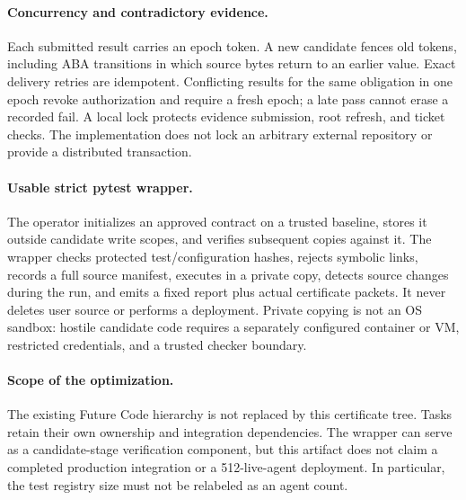 \documentclass[11pt]{article}
\theoremstyle{definition}\newtheorem{definition}[theorem]{Definition}
\theoremstyle{remark}\newtheorem{remark}[theorem]{Remark}
\begin{document}
\paragraph{Concurrency and contradictory evidence.}
Each submitted result carries an epoch token. A new candidate fences old tokens, including ABA transitions in which source bytes return to an earlier value. Exact delivery retries are idempotent. Conflicting results for the same obligation in one epoch revoke authorization and require a fresh epoch; a late pass cannot erase a recorded fail. A local lock protects evidence submission, root refresh, and ticket checks. The implementation does not lock an arbitrary external repository or provide a distributed transaction.

\paragraph{Usable strict pytest wrapper.}
The operator initializes an approved contract on a trusted baseline, stores it outside candidate write scopes, and verifies subsequent copies against it. The wrapper checks protected test/configuration hashes, rejects symbolic links, records a full source manifest, executes in a private copy, detects source changes during the run, and emits a fixed report plus actual certificate packets. It never deletes user source or performs a deployment. Private copying is not an OS sandbox: hostile candidate code requires a separately configured container or VM, restricted credentials, and a trusted checker boundary.

\paragraph{Scope of the optimization.}
The existing Future Code hierarchy is not replaced by this certificate tree. Tasks retain their own ownership and integration dependencies. The wrapper can serve as a candidate-stage verification component, but this artifact does not claim a completed production integration or a 512-live-agent deployment. In particular, the test registry size must not be relabeled as an agent count.




\appendix

\end{document}
